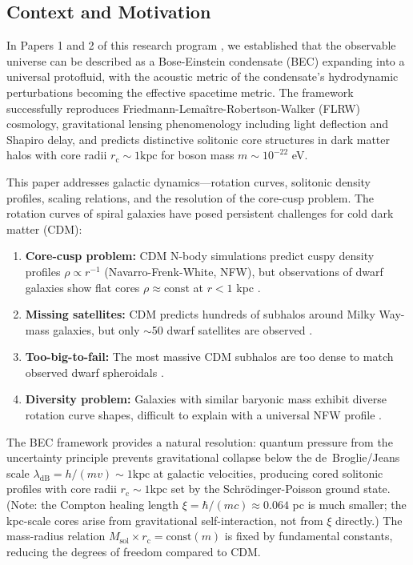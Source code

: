 \documentclass[11pt,a4paper]{article}
\newcommand{\Msol}{\ensuremath{M_{\mathrm{sol}}}}
\newcommand{\kpc}{\ensuremath{\mathrm{kpc}}}
\newcommand{\rc}{\ensuremath{r_{\mathrm{c}}}}
\newcommand{\lambdadB}{\ensuremath{\lambda_{\mathrm{dB}}}}
\theoremstyle{definition}
\theoremstyle{remark}
\begin{document}
\subsection{Context and Motivation}
\label{sec:motivation}

In Papers 1 and 2 of this research program \cite{Paper1,Paper2}, we established that the observable universe can be described as a Bose-Einstein condensate (BEC) expanding into a universal protofluid, with the acoustic metric of the condensate's hydrodynamic perturbations becoming the effective spacetime metric. The framework successfully reproduces Friedmann-Lema\^itre-Robertson-Walker (FLRW) cosmology, gravitational lensing phenomenology including light deflection and Shapiro delay, and predicts distinctive solitonic core structures in dark matter halos with core radii $\rc \sim 1 \kpc$ for boson mass $m \sim 10^{-22}$ eV.

This paper addresses galactic dynamics---rotation curves, solitonic density profiles, scaling relations, and the resolution of the core-cusp problem. The rotation curves of spiral galaxies have posed persistent challenges for cold dark matter (CDM):

\begin{enumerate}[leftmargin=*, itemsep=0.3em]
\item \textbf{Core-cusp problem:} CDM N-body simulations predict cuspy density profiles $\rho \propto r^{-1}$ (Navarro-Frenk-White, NFW), but observations of dwarf galaxies show flat cores $\rho \approx \text{const}$ at $r < 1$ kpc \cite{deBlok2010,Oh2015}.

\item \textbf{Missing satellites:} CDM predicts hundreds of subhalos around Milky Way-mass galaxies, but only $\sim$50 dwarf satellites are observed \cite{Klypin1999,Moore1999}.

\item \textbf{Too-big-to-fail:} The most massive CDM subhalos are too dense to match observed dwarf spheroidals \cite{BoylanKolchin2011}.

\item \textbf{Diversity problem:} Galaxies with similar baryonic mass exhibit diverse rotation curve shapes, difficult to explain with a universal NFW profile \cite{Oman2015}.
\end{enumerate}

The BEC framework provides a natural resolution: quantum pressure from the uncertainty principle prevents gravitational collapse below the de~Broglie/Jeans scale $\lambdadB = h/(mv) \sim 1 \kpc$ at galactic velocities, producing cored solitonic profiles with core radii $\rc \sim 1 \kpc$ set by the Schr\"odinger-Poisson ground state. (Note: the Compton healing length $\xi = \hbar/(mc) \approx 0.064$ pc is much smaller; the kpc-scale cores arise from gravitational self-interaction, not from $\xi$ directly.) The mass-radius relation $\Msol \times \rc = \text{const}(m)$ is fixed by fundamental constants, reducing the degrees of freedom compared to CDM.
\end{document}
